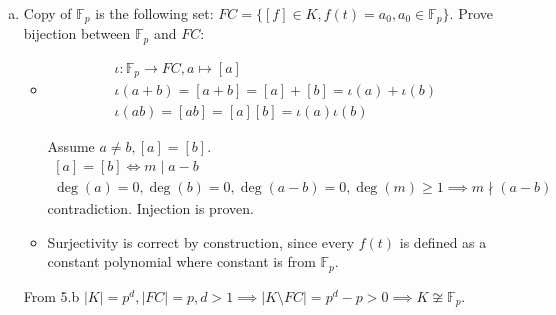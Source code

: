 \documentclass[12pt]{article}
\begin{document}
\begin{enumerate}
\begin{enumerate}[a)]
                analogous to 5.c

                \[
                \begin{gathered}
                  a_{d-1}t^{d-1} + a_{d-2}t^{d-2} + \cdots + a_0 + m(a_{d-1}h_{d-1} + a_{d-2} h_{d-2} + \cdots + a_1 h_1) \iff \\
                  f + m(a_{d-1}h_{d-1} + a_{d-2} h_{d-2} + \cdots + a_1 h_1) \iff [f]
                \end{gathered}
                \]
          \item
                Copy of $\mathbb{F}_p$ is the following set: $FC=\{[f] \in K, f(t) = a_0, a_0 \in \mathbb{F}_p\}$. Prove bijection between $\mathbb{F}_p$ and $FC$:

                \begin{itemize}
                  \item \[
                        \begin{gathered}
                          \iota \colon \mathbb{F}_p\to FC, a \mapsto [a] \\
                          \iota(a + b) = [a + b] = [a] + [b] = \iota(a) + \iota(b) \\
                          \iota(ab) = [ab] = [a][b] = \iota(a) \iota(b)
                        \end{gathered}
                        \]

                        Assume $a \neq b, [a] = [b]$.
                        \[
                        \begin{gathered}
                          [a] = [b] \iff m \mid a - b \\
                          \deg(a) = 0, \deg(b) = 0, \deg(a - b) = 0, \deg(m) \geq 1 \implies m \nmid (a - b)
                        \end{gathered}
                        \]
                        contradiction. Injection is proven.
                  \item Surjectivity is correct by construction, since every $f(t)$ is defined as a constant polynomial where constant is from $\mathbb{F}_p$.
                \end{itemize}

                From 5.b $|K| = p^d, |FC| = p, d > 1 \implies |K \setminus FC| = p^d - p > 0 \implies K \not\cong \mathbb{F}_p$.
        \end{enumerate}


\end{enumerate}
\end{document}

